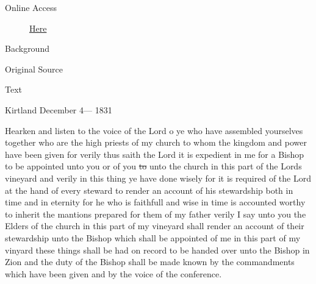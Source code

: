 {			\begin{description}
				\item[Online Access] \href{https://www.josephsmithpapers.org/paper-summary/revelation-4-december-1831-a-dc-721-8/1}{Here}
			\end{description}
			
			\begin{description}
				\item[Background]
			\end{description}
			
			
			\begin{description}
				\item[Original Source]
			\end{description}
			
			
			\begin{description}
				\item[Text]
			\end{description}
				
				\begin{tightcenter}
				Kirtland December 4--- 1831
				\end{tightcenter}
				
				Hearken and listen to the voice of the Lord o ye who have assembled yourselves together who are the high priests of my church to whom the kingdom and power have been given for verily thus saith the Lord it is expedient in me for a Bishop to be appointed unto you or of you \sout{to} unto the church in this part of the Lords vineyard and verily in this thing ye have done wisely for it is required of the Lord at the hand of every steward to render an account of his stewardship both in time and in eternity for he who is faithfull and wise in time is accounted worthy to inherit the mantions prepared for them of my father verily I say unto you the Elders of the church in this part of my vineyard shall render an account of their stewardship unto the Bishop which shall be appointed of me in this part of my vinyard these things shall be had on record to be handed over unto the Bishop in Zion and the duty of the Bishop shall be made known by the commandments which have been given and by the voice of the conference.
				
}
